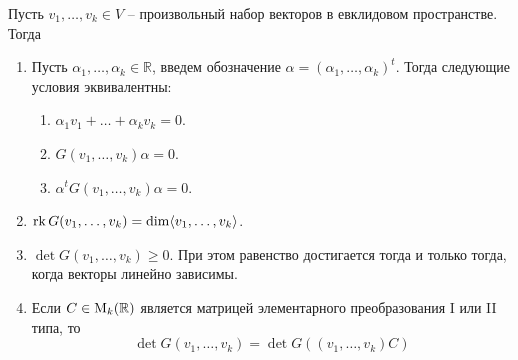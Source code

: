 \begin{claim}
\label{claim::GramMatrixFull}
Пусть $v_1,\ldots,v_k\in V$ -- произвольный набор векторов в евклидовом пространстве.
Тогда
\begin{enumerate}
\item Пусть $\alpha_1,\ldots,\alpha_k \in \mathbb R$, введем обозначение $\alpha = (\alpha_1,\ldots,\alpha_k)^t$.
Тогда следующие условия эквивалентны:
\begin{enumerate}
\item $\alpha_1 v_1 + \ldots + \alpha_k v_k = 0$.

\item $G(v_1,\ldots,v_k)\alpha= 0$.

\item $\alpha^tG(v_1,\ldots,v_k)\alpha= 0$.
\end{enumerate}
\item $\operatorname{rk} G(v_1,\ldots,v_k) = \dim \langle v_1,\ldots,v_k\rangle$.

\item  $\det G(v_1,\ldots,v_k)\geqslant 0$.
При этом равенство достигается тогда и только тогда, когда векторы линейно зависимы.

\item Если $C\in\operatorname{M}_{k}(\mathbb R)$ является матрицей элементарного преобразования I или II типа, то 
\[
\det G(v_1,\ldots,v_k) = \det G((v_1,\ldots,v_k)C)
\]
\end{enumerate}
\end{claim}
